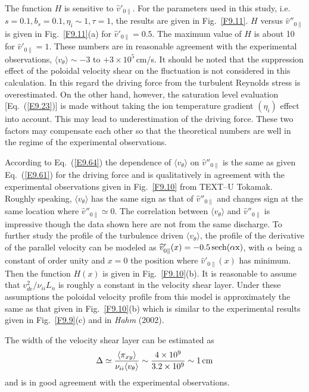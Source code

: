 \documentclass[a4paper,openany,12pt]{book}
\begin{document}
{The function $H$ is sensitive to $\widehat v'_{0\|}$. For the parameters used in this study, i.e. $s=0.1, b_s=0.1, \eta_i\sim 1, \tau=1$, the results are given in Fig.~\ref{F9.11}. $H$ versus $\widehat v''_{0\|}$ is given in Fig.~\ref{F9.11}(a) for $\widehat v'_{0\|}=0.5$. The maximum value of $H$ is about 10 for $\widehat v'_{0\|}=1$. These numbers are in reasonable agreement with the experimental observations, 
$\langle v_\theta\rangle\sim-3$ to $+3\times 10^5\,$cm/s. It should be noted that the suppression effect of the poloidal velocity shear on the fluctuation is not considered in this calculation. In this regard the driving force from the turbulent Reynolds stress is overestimated. On the other hand, however, the saturation level evaluation [Eq.~(\ref{E9.23})] is made without taking the ion temperature gradient 
$(\eta_i)$ effect into account. This may lead to underestimation of the driving force. These two factors may compensate each other so that the theoretical numbers are well in the regime of the experimental observations.

According to Eq.~(\ref{E9.64}) the dependence of $\langle v_\theta\rangle$ on $\widehat v''_{0\|}$ is the same as given Eq.~(\ref{E9.61}) for the driving force and is qualitatively in agreement with the experimental observations given in Fig.~\ref{F9.10} from TEXT--U Tokamak. Roughly speaking, $\langle v_\theta\rangle$ has the same sign as that of $\widehat v''_{0\|}$ and changes sign at the same location where $\widehat v''_{0\|}\simeq 0$. The correlation between $\langle v_\theta\rangle$ and $\widehat v''_{0\|}$ is impressive though the data shown here are not from the same discharge. To further study the profile of the turbulence driven $\langle v_\theta\rangle$, the profile of the derivative of the parallel velocity can be modeled as $\widehat v'_{0\|}(x)=-0.5\,\rm sech(\alpha \mathrm{x})$, with $\alpha$ being a constant of order unity and $x=0$ the position where $\widehat v'_{0\|}(x)$ has minimum. Then the function $H(x)$ is given in Fig.~\ref{F9.10}(b). It is reasonable to assume that $v_{de}^2/\nu_{ii}L_n$ is roughly a constant in the velocity shear layer. Under these assumptions the poloidal velocity profile from this model is approximately the same as that given in Fig.~\ref{F9.10}(b) which is similar to the experimental results given in Fig.~\ref{F9.9}(c) and in \emph{Hahm} (2002).

The width of the velocity shear layer can be estimated as
\begin{equation}
\Delta\simeq\frac{\langle\pi_{xy}\rangle}{\nu_{ii}\langle v_\theta\rangle}\sim
\frac{4\times 10^9}{3.2\times 10^9}\sim 1\,\rm cm\label{E9.66}
\end{equation}
and is in good agreement with the experimental observations.

}
\end{document}
